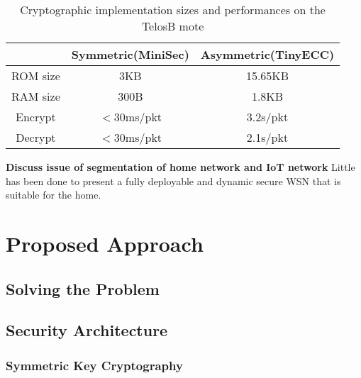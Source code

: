 \documentclass{mprop}
\begin{document}
\begin{table}[h] %
  \begin{center} 
  \label{tab:crypto_compare}
  \begin{tabular}{|c|c|c|} 
  \hline
           & Symmetric(MiniSec) & Asymmetric(TinyECC) \\ \hline
  ROM size & 3KB                & 15.65KB \\ \hline
  RAM size & 300B               & 1.8KB \\ \hline
  Encrypt  & $<$30ms/pkt        & 3.2s/pkt \\ \hline 
  Decrypt  & $<$30ms/pkt        & 2.1s/pkt \\ \hline
  \end{tabular}
  \caption{Cryptographic implementation sizes and performances on the TelosB mote}
  \end{center}
\end{table}

\textbf{Discuss issue of segmentation of home network and IoT network}
Little has been done to present a fully deployable and dynamic secure WSN that is suitable for the home. 



\section{Proposed Approach}



\subsection{Solving the Problem} %
\label{sub:solving_the_problem}

\subsection{Security Architecture} %
\label{sub:security_architecture}

\subsubsection{Symmetric Key Cryptography} %
\label{ssub:symmetric_key_cryptography}
\end{document}
